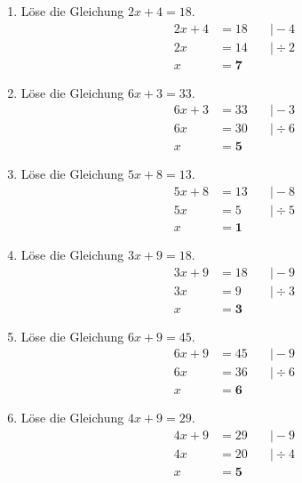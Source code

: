 \documentclass[a4paper,12pt]{article} %
\begin{document}
\begin{enumerate}

  \item Löse die Gleichung \(2x + 4 = 18\).
  \[
  \begin{aligned}
    2x + 4 &= 18 \quad &\big| -4 \\
    2x &= 14 \quad &\big| \div 2 \\
    x &= \mathbf{7}
  \end{aligned}
  \]

  \item Löse die Gleichung \(6x + 3 = 33\).
  \[
  \begin{aligned}
    6x + 3 &= 33 &\quad\big| -3 \\
    6x &= 30 &\quad\big| \div 6 \\
    x &= \mathbf{5}
  \end{aligned}
  \]

  \item Löse die Gleichung \(5x + 8 = 13\).
  \[
  \begin{aligned}
    5x + 8 &= 13 &\quad\big| -8 \\
    5x &= 5 &\quad\big| \div 5 \\
    x &= \mathbf{1}
  \end{aligned}
  \]

  \item Löse die Gleichung \(3x + 9 = 18\).
  \[
  \begin{aligned}
    3x + 9 &= 18 &\quad\big| -9 \\
    3x &= 9 &\quad\big| \div 3 \\
    x &= \mathbf{3}
  \end{aligned}
  \]

  \item Löse die Gleichung \(6x + 9 = 45\).
  \[
  \begin{aligned}
    6x + 9 &= 45 &\quad\big| -9 \\
    6x &= 36 &\quad\big| \div 6 \\
    x &= \mathbf{6}
  \end{aligned}
  \]

  \item Löse die Gleichung \(4x + 9 = 29\).
  \[
  \begin{aligned}
    4x + 9 &= 29 &\quad\big| -9 \\
    4x &= 20 &\quad\big| \div 4 \\
    x &= \mathbf{5}
  \end{aligned}
  \]


\end{enumerate}
\end{document}
